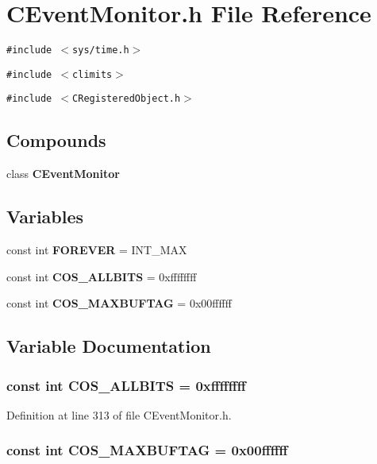 \section{CEvent\-Monitor.h File Reference}
\label{CEventMonitor_8h}
{\tt \#include $<$sys/time.h$>$}\par
{\tt \#include $<$climits$>$}\par
{\tt \#include $<$CRegistered\-Object.h$>$}\par
\subsection*{Compounds}
\begin{CompactItemize}
\item 
class {\bf CEvent\-Monitor}
\end{CompactItemize}
\subsection*{Variables}
\begin{CompactItemize}
\item 
const int {\bf FOREVER} = INT\_\-MAX
\item 
const int {\bf COS\_\-ALLBITS} = 0xffffffff
\item 
const int {\bf COS\_\-MAXBUFTAG} = 0x00ffffff
\end{CompactItemize}


\subsection{Variable Documentation}
\subsubsection{\setlength{\rightskip}{0pt plus 5cm}const int COS\_\-ALLBITS = 0xffffffff\hspace{0.3cm}{\tt  [static]}}\label{CEventMonitor_8h_a1}




Definition at line 313 of file CEvent\-Monitor.h.
\subsubsection{\setlength{\rightskip}{0pt plus 5cm}const int COS\_\-MAXBUFTAG = 0x00ffffff\hspace{0.3cm}{\tt  [static]}}\label{CEventMonitor_8h_a2}




